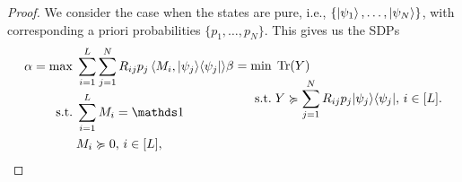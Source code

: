 \begin{proof}
We consider the case when the states are pure, i.e., $\{\ket{\psi_1}, \dots, \ket{\psi_N}\}$, with corresponding a priori probabilities $\{p_1, \dots, p_N\}$. 
This gives us the SDPs 
\begin{equation}
\label{prog:ch3_QSD-P_D_reduced}
        \begin{aligned}
            \alpha = \max \; & \sum_{i=1}^L \sum_{j=1}^N R_{ij} p_j \inner{M_i}{\kb{\psi_j}} \\
            \suchthat \; & \sum_{i=1}^L M_i = \id \\
            & M_i \succcurlyeq 0, \, i \in [L], 
        \end{aligned}
        \begin{aligned}
            \beta = \min \; & \Tr(Y) \\
            \suchthat \; & Y \succcurlyeq \sum_{j=1}^N R_{ij} p_j \kb{\psi_j}, \, i \in [L]. \\
            & \phantom{N}
        \end{aligned}
\end{equation} 


\end{proof}
